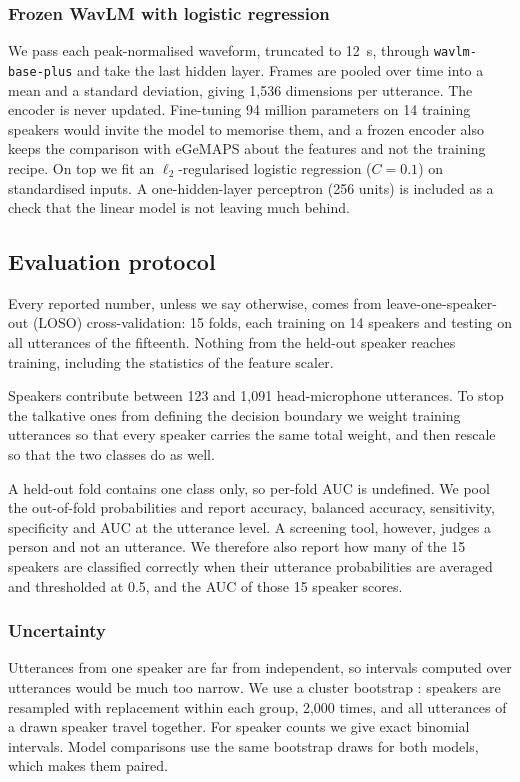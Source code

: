 \documentclass[conference]{IEEEtran}
\begin{document}
\subsubsection{Frozen WavLM with logistic regression}
We pass each peak-normalised waveform, truncated to 12~s, through \texttt{wavlm-base-plus} \cite{chen2022} and take the last hidden layer. Frames are pooled over time into a mean and a standard deviation, giving 1,536 dimensions per utterance. The encoder is never updated. Fine-tuning 94 million parameters on 14 training speakers would invite the model to memorise them, and a frozen encoder also keeps the comparison with eGeMAPS about the features and not the training recipe. On top we fit an $\ell_2$-regularised logistic regression ($C=0.1$) on standardised inputs. A one-hidden-layer perceptron (256 units) is included as a check that the linear model is not leaving much behind.

\subsection{Evaluation protocol}
\label{sec:protocol}
Every reported number, unless we say otherwise, comes from leave-one-speaker-out (LOSO) cross-validation: 15 folds, each training on 14 speakers and testing on all utterances of the fifteenth. Nothing from the held-out speaker reaches training, including the statistics of the feature scaler.

Speakers contribute between 123 and 1,091 head-microphone utterances. To stop the talkative ones from defining the decision boundary we weight training utterances so that every speaker carries the same total weight, and then rescale so that the two classes do as well.

A held-out fold contains one class only, so per-fold AUC is undefined. We pool the out-of-fold probabilities and report accuracy, balanced accuracy, sensitivity, specificity and AUC at the utterance level. A screening tool, however, judges a person and not an utterance. We therefore also report how many of the 15 speakers are classified correctly when their utterance probabilities are averaged and thresholded at 0.5, and the AUC of those 15 speaker scores.

\subsubsection{Uncertainty}
Utterances from one speaker are far from independent, so intervals computed over utterances would be much too narrow. We use a cluster bootstrap \cite{efron1993}: speakers are resampled with replacement within each group, 2,000 times, and all utterances of a drawn speaker travel together. For speaker counts we give exact binomial intervals. Model comparisons use the same bootstrap draws for both models, which makes them paired.
\end{document}
